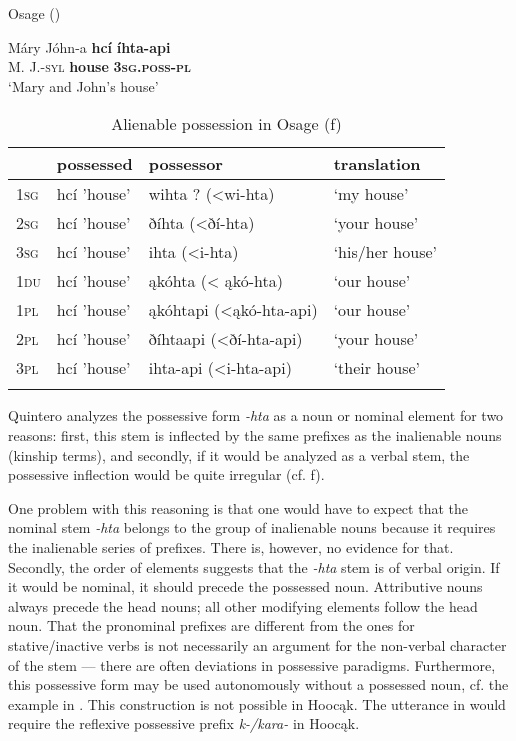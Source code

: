 \documentclass[output=paper]{LSP/langsci}
\begin{document}
\ex Osage (\citealt[299]{Quintero2004}) \label{osagemaryandjohn}

\gll Máry Jóhn-a  \textbf{hc\'i}  \textbf{íhta-api} \\
M.      J.-\textsc{syl}   \textbf{house} \textbf{\textsc{3sg.poss-pl}} \\
\glt `Mary and John's house'
\z

\begin{table}
\caption{Alienable possession in Osage (\citealt[297]{Quintero2004}f)} \label{osagealienableposs}
\begin{tabular}{ l l l l }
\lsptoprule
& possessed & possessor & translation \\
\midrule
\textsc{1sg} & hcí  'house'	& wihta ? (<wi-hta) & `my house' \\
 
\textsc{2sg} & hcí  'house'	& ðíhta (<ðí-hta)	& `your house' \\
 
\textsc{3sg} & hcí  'house'	& ihta (<i-hta)	& `his/her house' \\
 
\textsc{1du} & hcí  'house' & ąkóhta (< ąkó-hta) & `our house' \\
 
\textsc{1pl} & hcí  'house' & ąkóhtapi (<ąkó-hta-api) & `our house' \\
 
\textsc{2pl} & hcí  'house' & ðíhtaapi (<ðí-hta-api) & `your house' \\
 
\textsc{3pl} & hcí  'house' & ihta-api (<i-hta-api) & `their house' \\
\lspbottomrule
\end{tabular}
\end{table}

Quintero analyzes the possessive form \textit{-hta} as a noun or nominal element for two reasons: first, this stem is inflected by the same prefixes as the inalienable nouns (kinship terms), and secondly, if it would be analyzed as a verbal stem, the possessive inflection would be quite irregular (cf. \citealt[317]{Quintero2004}f). 

One problem with this reasoning is that one would have to expect that the nominal stem \textit{-hta} belongs to the group of inalienable nouns because it requires the inalienable series of prefixes. There is, however, no evidence for that. Secondly, the order of elements suggests that the \textit{-hta} stem is of verbal origin. If it would be nominal, it should precede the possessed noun. Attributive nouns always precede the head nouns; all other modifying elements follow the head noun. That the pronominal prefixes are different from the ones for stative/inactive verbs is not necessarily an argument for the non-verbal character of the stem --- there are often deviations in possessive paradigms. Furthermore, this possessive form may be used autonomously without a possessed noun, cf. the example in . This construction is not possible in Hoocąk. The utterance in  would require the reflexive possessive prefix \textit{k-/kara-} in Hoocąk.
\end{document}
